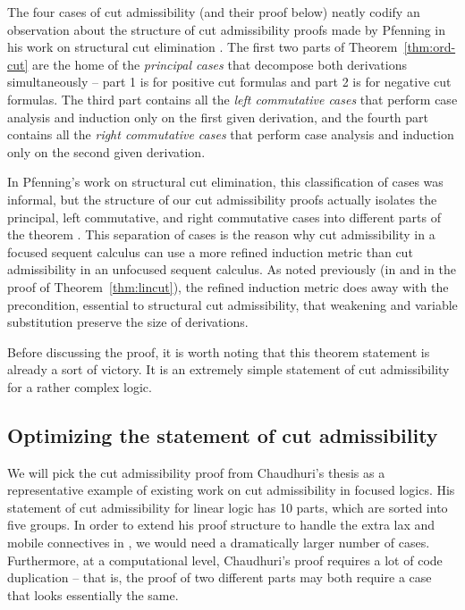 \noindent
The four cases of cut admissibility (and their proof below) neatly
codify an observation about the structure of cut admissibility proofs
made by Pfenning in his work on structural cut elimination
\cite{pfenning00structural}.  The first two parts of
Theorem~\ref{thm:ord-cut} are the home of the {\it principal cases}
that decompose both derivations simultaneously -- part 1 is for
positive cut formulas and part 2 is for negative cut formulas. The third
part contains all the {\it left commutative cases} that perform case
analysis and induction only on the first given derivation, and the
fourth part contains all the {\it right commutative cases} that
perform case analysis and induction only on the second given
derivation.

In Pfenning's work on structural cut elimination, this classification
of cases was informal, but the structure of our cut admissibility
proofs actually isolates the principal, left commutative, and right
commutative cases into different parts of the theorem
\cite{pfenning00structural}. This separation of cases is the reason
why cut admissibility in a focused sequent calculus can use a more
refined induction metric than cut admissibility in an unfocused
sequent calculus. As noted previously (in \cite{simmons11structural}
and in the proof of Theorem~\ref{thm:lincut}), the
refined induction metric 
does away with the precondition, essential to structural cut admissibility,
that weakening and variable substitution preserve
the size of derivations.

Before discussing the proof, it is worth noting that this theorem
statement is already a sort of victory. It is an extremely simple
statement of cut admissibility for a rather complex logic.

\subsection{Optimizing the statement of cut admissibility}

We will pick the cut admissibility proof
from Chaudhuri's thesis \cite{chaudhuri06focused} as a representative
example of existing work on cut admissibility in focused logics.  His
statement of cut admissibility for linear logic has 10 parts, 
which are sorted into
five groups. In order to extend his
proof structure to handle the extra lax and mobile connectives in
\ollll, we would need a dramatically larger number of
cases. Furthermore, at a computational level, Chaudhuri's proof
requires a lot of code duplication -- that is, the proof of two
different parts may both require a case that looks essentially the
same.

